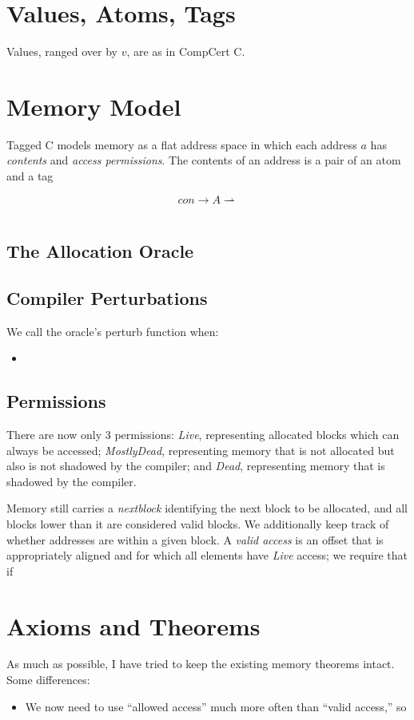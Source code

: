 \documentclass{article}
\begin{document}
\section{Values, Atoms, Tags}

Values, ranged over by \(v\), are as in CompCert C.

\section{Memory Model}

Tagged C models memory as a flat address space in which each address \(a\)
has {\it contents} and {\it access permissions}. The contents of an address
is a pair of an atom and a tag

\[\mathit{con} \rightarrow A \rightharpoonup \]

\begin{tabular}{l l}
  
\end{tabular}

\subsection{The Allocation Oracle}

\subsection{Compiler Perturbations}

We call the oracle's perturb function when:
\begin{itemize}
\item 
\end{itemize}

\subsection{Permissions}

There are now only 3 permissions:
{\it Live}, representing allocated blocks which can always be accessed;
{\it MostlyDead}, representing memory that is not allocated but also is
not shadowed by the compiler; and
{\it Dead}, representing memory that is shadowed by the compiler.

Memory still carries a {\it nextblock} identifying the next block to be allocated,
and all blocks lower than it are considered valid blocks. We additionally keep track
of whether addresses are within a given block. A {\it valid access} is an offset that
is appropriately aligned and for which all elements have {\it Live} access; we require
that if 



\section{Axioms and Theorems}

As much as possible, I have tried to keep the existing memory theorems intact.
Some differences:

\begin{itemize}
\item We now need to use ``allowed access'' much more often than ``valid access,'' so
  
\end{itemize}
\end{document}
